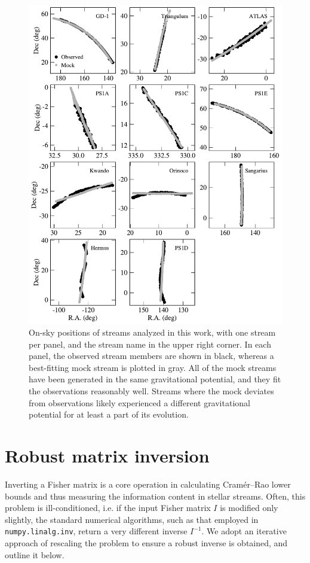 \documentclass[modern]{aastex61}
\begin{document}
\begin{figure}
\begin{center}
\includegraphics[width=\textwidth]{mocks.pdf}
\caption{On-sky positions of streams analyzed in this work, with one stream per panel, and the stream name in the upper right corner.
In each panel, the observed stream members are shown in black, whereas a best-fitting mock stream is plotted in gray.
All of the mock streams have been generated in the same gravitational potential, and they fit the observations reasonably well.
Streams where the mock deviates from observations likely experienced a different gravitational potential for at least a part of its evolution.
}
\label{fig:gallery}
\end{center}
\end{figure}

\section{Robust matrix inversion}
\label{sec:inversion}
Inverting a Fisher matrix is a core operation in calculating Cram\' er--Rao lower bounds and thus measuring the information content in stellar streams. 
Often, this problem is ill-conditioned, i.e. if the input Fisher matrix $I$ is modified only slightly, the standard numerical algorithms, such as that employed in \texttt{numpy.linalg.inv}, return a very different inverse $I^{-1}$.
We adopt an iterative approach of rescaling the problem to ensure a robust inverse is obtained, and outline it below.
\end{document}
